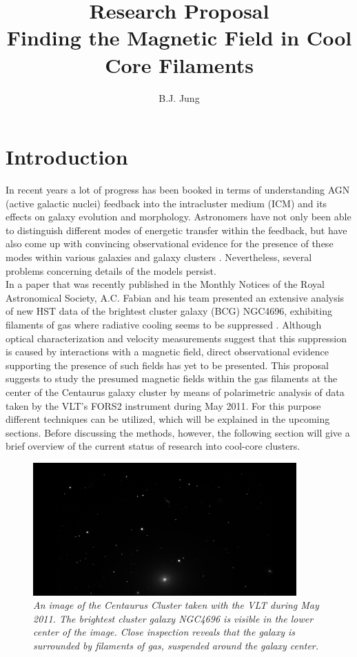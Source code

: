 \documentclass[twoside,single]{lion-msc}
\title{Research Proposal \\ \small{\textbf{Finding the Magnetic Field in Cool Core Filaments}}}
\author{B.J. Jung}
\affiliation{Leiden Observatory, Leiden University}
\begin{document}
\maketitle

\chapter{Introduction}

    \par In recent years a lot of progress has been booked in terms of understanding AGN (active galactic nuclei) feedback into the intracluster medium (ICM) and its effects on galaxy evolution and morphology. Astronomers have not only been able to distinguish different modes of energetic transfer within the feedback, but have also come up with convincing observational evidence for the presence of these modes within various galaxies and galaxy clusters \citep{Fabian2012}. Nevertheless, several problems concerning details of the models persist. \\
    In a paper that was recently published in the Monthly Notices of the Royal Astronomical Society, A.C. Fabian and his team presented an extensive analysis of new HST data of the brightest cluster galaxy (BCG) NGC4696, exhibiting filaments of gas where radiative cooling seems to be suppressed \citep{Fabian2016}. Although optical characterization and velocity measurements suggest that this suppression is caused by interactions with a magnetic field, direct observational evidence supporting the presence of such fields has yet to be presented. This proposal suggests to study the presumed magnetic fields within the gas filaments at the center of the Centaurus galaxy cluster by means of polarimetric analysis of data taken by the VLT's FORS2 instrument during May 2011. For this purpose different techniques can be utilized, which will be explained in the upcoming sections. Before discussing the methods, however, the following section will give a brief overview of the current status of research into cool-core clusters. \\
    
    \begin{figure}
      \centering
        \includegraphics[width=0.9\textwidth]{NGC4696.jpeg}
      \caption{\textit{An image of the Centaurus Cluster taken with the VLT during May 2011. The brightest cluster galaxy NGC4696 is visible in the lower center of the image. Close inspection reveals that the galaxy is surrounded by filaments of gas, suspended around the galaxy center.}}
      \label{fig:NGC4696}
    \end{figure}
    
\end{document}
